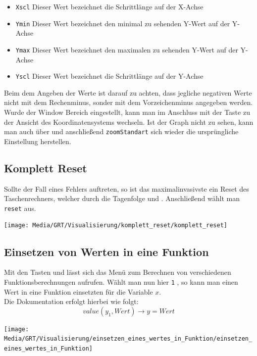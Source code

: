 \begin{itemize}
	\item[] \texttt{Xscl} Dieser Wert bezeichnet die Schrittlänge auf der X-Achse 
	\item[] \texttt{Ymin} Dieser Wert bezeichnet den minimal zu sehenden Y-Wert auf der Y-Achse
	\item[] \texttt{Ymax} Dieser Wert bezeichnet den maximalen zu sehenden Y-Wert auf der Y-Achse
	\item[] \texttt{Yscl} Dieser Wert bezeichnet die Schrittlänge auf der Y-Achse
\end{itemize} Beim dem Angeben der Werte ist darauf zu achten, dass jegliche negativen Werte nicht mit dem Rechenminus, sonder mit dem Vorzeichenminus angegeben werden. Wurde der Window Bereich eingestellt, kann man im Anschluss mit der Taste  zu der Ansicht des Koordinatensystems wechseln.
Ist der Graph nicht zu sehen, kann man auch über  und anschließend \texttt{zoomStandart} sich wieder die ursprüngliche Einstellung herstellen. 

\subsection{Komplett Reset}
\begin{paracol}{2}
\begin{flushleft}
	Sollte der Fall eines Fehlers auftreten, so ist das maximalinvasivste ein Reset des Taschenrechners, welcher durch die Tagenfolge  und \gtr{+}. Anschließend wählt man \texttt{reset} aus.
\end{flushleft}
\switchcolumn
\begin{flushright}
	\texttt{[image: Media/GRT/Visualisierung/komplett\_reset/komplett\_reset]}
\end{flushright}	
\end{paracol}

\subsection{Einsetzen von Werten in eine Funktion}
\begin{paracol}{2}
\begin{flushleft}
	Mit den Tasten  und  lässt sich das Menü zum Berechnen von verschiedenen Funktionsberechnungen aufrufen. Wählt man nun hier \texttt{1} , so kann man einen Wert in eine Funktion einsetzten für die Variable $x$.\\
	Die Dokumentation erfolgt hierbei wie folgt: \\
	\[{value(y_1,Wert)\rightarrow y=Wert}\]
	
\end{flushleft}
\switchcolumn
\begin{flushright}
	\texttt{[image: Media/GRT/Visualisierung/einsetzen\_eines\_wertes\_in\_Funktion/einsetzen\_eines\_wertes\_in\_Funktion]}
\end{flushright}
\end{paracol}
\pagebreak
